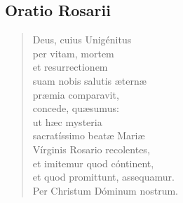 \subsection*{Oratio Rosarii}
\vspace{-0.5em}

\begin{verse}
        Deus, cuius Unig\'enitus
\\\vin      per vitam, mortem
\\\vin      et resurrectionem
\\      suam nobis salutis æternæ
\\\vin      præmia comparavit,
\\      concede, quæsumus:
\\      ut hæc mysteria
\\\vin      sacrat\'issimo beatæ Mariæ
\\\vin      V\'irginis Rosario recolentes,
\\      et imitemur quod c\'ontinent,
\\      et quod promittunt, assequamur.
\\      Per Christum D\'ominum nostrum.
\end{verse}